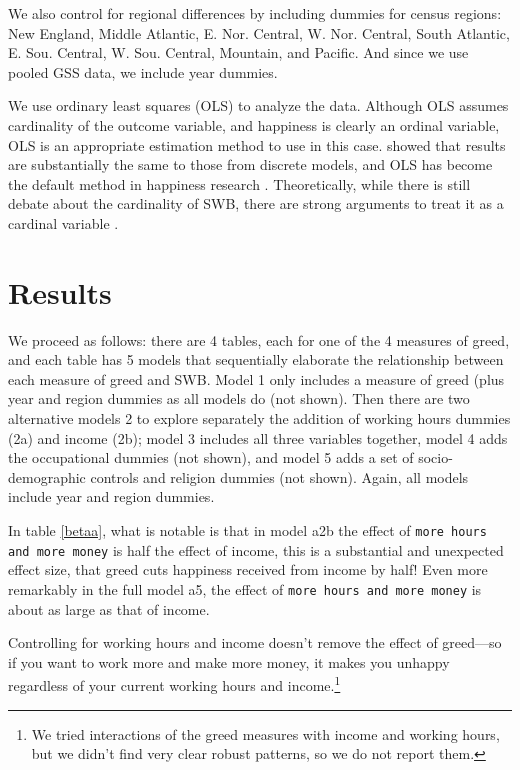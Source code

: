 \documentclass[10pt, letterpaper]{article}
\begin{document}
\begin{spacing}{1.8}
We also control for regional  differences by including dummies for census regions:  New England, Middle Atlantic, E. Nor. Central, W. Nor. Central, South
Atlantic, E. Sou. Central, W. Sou. Central, Mountain, and Pacific. And since we use pooled GSS data, we include year dummies.

We use ordinary least squares (OLS) to analyze the data. Although OLS assumes cardinality of the outcome variable, and happiness is clearly an ordinal variable, 
OLS is an appropriate estimation method to use in this case. \citet{carbonell04} showed that results are substantially the same to those from discrete models, 
and OLS has become the default method in happiness research \citep{blanchflower11}.
Theoretically, while there is still debate about the cardinality of SWB, there are strong arguments to treat it as a cardinal variable \citep{ng96,ng97,ng11}. 


\section{Results}

We proceed as follows: there are 4 tables, each for one of the 4  measures of
greed, and each table has 5 models that sequentially elaborate the relationship between each measure of greed and SWB. Model 1 only includes a measure of greed (plus year and region dummies as all models do (not shown). Then there are two
alternative models 2 to explore separately the addition of working hours dummies (2a)
and income (2b); model 3 includes all three variables together, model 4 adds the occupational dummies (not shown), and model 5 adds a set of socio-demographic
controls and religion dummies (not shown). 
Again, all models include year and region dummies.
 
In table \ref{betaa}, what is notable is that in model a2b the effect of \texttt{more hours and more money} is half the effect of income, this is a substantial and unexpected effect size, that greed cuts happiness received from income by half! Even more remarkably in the full model a5, the effect of \texttt{more hours and more money} is about as large as that of income.

Controlling for working hours and income doesn't remove the effect of greed---so
if you want to work more and make more money, it makes you unhappy regardless of your current working hours and
income.\footnote{We tried interactions of the greed measures with income and working hours, but we didn't find very clear robust patterns, so we do not report them.}



\end{spacing}
\end{document}
